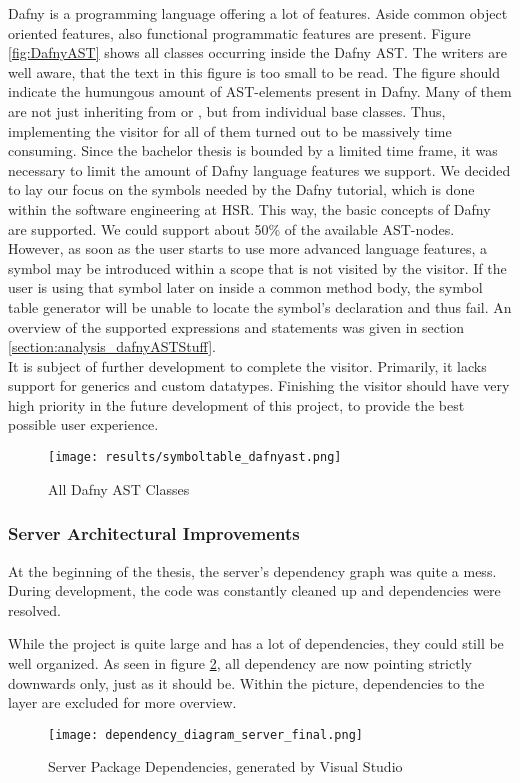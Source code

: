 Dafny is a programming language offering a lot of features.
Aside common object oriented features, also functional programmatic features are present.
Figure \ref{fig:DafnyAST} shows all classes occurring inside the Dafny AST.
The writers are well aware, that the text in this figure is too small to be read.
The figure should indicate the humungous amount of AST-elements present in Dafny.
Many of them are not just inheriting from  or , but from individual base classes.
Thus, implementing the visitor for all of them turned out to be massively time consuming.
Since the bachelor thesis is bounded by a limited time frame, it was necessary to limit the amount of Dafny language features we support.
We decided to lay our focus on the symbols needed by the Dafny tutorial, which is done within the software engineering at HSR.
This way, the basic concepts of Dafny are supported.
We could support about 50\% of the available AST-nodes.
However, as soon as the user starts to use more advanced language features, a symbol may be introduced within a scope that is not visited by the visitor.
If the user is using that symbol later on inside a common method body, the symbol table generator will be unable to locate the symbol's declaration and thus fail.
An overview of the supported expressions and statements was given in section \ref{section:analysis_dafnyASTStuff}.\\

It is subject of further development to complete the visitor.
Primarily, it lacks support for generics and custom datatypes.
Finishing the visitor should have very high priority in the future development of this project,
to provide the best possible user experience.

\begin{figure}[H]
    \centering
    \texttt{[image: results/symboltable\_dafnyast.png]}
    \caption{All Dafny AST Classes}
    \label{fig:dafnyASTOverview}
\end{figure}

\subsubsection{Server Architectural Improvements}
At the beginning of the thesis, the server's dependency graph was quite a mess.
During development, the code was constantly cleaned up and dependencies were resolved.

While the project is quite large and has a lot of dependencies, they could still be well organized.
As seen in figure \ref{fig:dependency_graph}, all dependency are now pointing strictly downwards only, just as it should be.
Within the picture, dependencies to the  layer are excluded for more overview.
\begin{figure}[H]
    \centering
    \texttt{[image: dependency\_diagram\_server\_final.png]}
    \caption{Server Package Dependencies, generated by Visual Studio}
    \label{fig:dependency_graph}
\end{figure}

